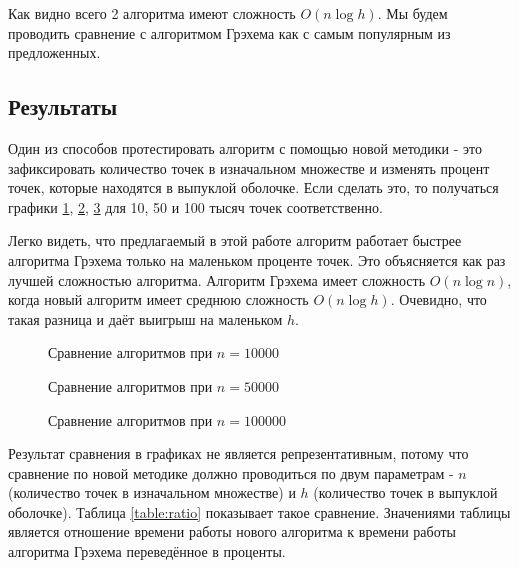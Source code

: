 Как видно всего 2 алгоритма имеют сложность $O(n \log h)$. Мы будем проводить сравнение с алгоритмом Грэхема как с самым популярным из предложенных.

\subsection{Результаты}

Один из способов протестировать алгоритм с помощью новой методики - это зафиксировать количество точек в изначальном множестве и изменять процент точек, которые находятся в выпуклой оболочке. Если сделать это, то получаться графики \ref{img:comparison_10000}, \ref{img:comparison_50000}, \ref{img:comparison_100000} для 10, 50 и 100 тысяч точек соответственно.

Легко видеть, что предлагаемый в этой работе алгоритм работает быстрее алгоритма Грэхема только на маленьком проценте точек. Это объясняется как раз лучшей сложностью алгоритма. Алгоритм Грэхема имеет сложность $O(n \log n)$, когда новый алгоритм имеет среднюю сложность $O(n \log h)$. Очевидно, что такая разница и даёт выигрыш на маленьком $h$.

\begin{figure}[H]
	\centering
	
	\caption{Сравнение алгоритмов при $n = 10000$}
	\label{img:comparison_10000}
\end{figure}

\begin{figure}[H]
	\centering
	
	\caption{Сравнение алгоритмов при $n = 50000$}
	\label{img:comparison_50000}
\end{figure}

\begin{figure}[H]
	\centering
	
	\caption{Сравнение алгоритмов при $n = 100000$}
	\label{img:comparison_100000}
\end{figure}

Результат сравнения в графиках не является репрезентативным, потому что сравнение по новой методике должно проводиться по двум параметрам - $n$ (количество точек в изначальном множестве) и $h$ (количество точек в выпуклой оболочке). Таблица \ref{table:ratio} показывает такое сравнение. Значениями таблицы является отношение времени работы нового алгоритма к времени работы алгоритма Грэхема переведённое в проценты.

